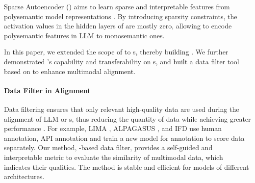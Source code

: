 Sparse Autoencoder (\old{}) aims to learn sparse and interpretable features from polysemantic model representations \cite{yun2021transformer,bricken2023towards,sharkey2022features,peigne2023features, elhage2022toy}. By introducing sparsity constraints, the activation values in the hidden layers of \old{} are mostly zero, allowing \old{} to encode polysemantic features in LLM to monosemantic ones. 

In this paper, we extended the scope of \old{} to \model{}s, thereby building \ours{}. We further demonstrated \ours{}'s capability and transferability on \model{}s, and built a data filter tool based on \ours{} to enhance multimodal alignment.

\paragraph{Data Filter in Alignment}

Data filtering ensures that only relevant high-quality data are used during the alignment of LLM or \model{} s, thus reducing the quantity of data while achieving greater performance \cite{zhou2023lima,chen2023alpagasus,du2023mods,li2023one,li2023quantity,tu2024resofilter}. For example, LIMA \cite{zhou2023lima}, ALPAGASUS \cite{chen2023alpagasus}, and IFD \cite{li2023quantity} use human annotation, API annotation and train a new model for annotation to score data separately. Our method, \ours{}-based data filter, provides a self-guided and interpretable metric to evaluate the similarity of multimodal data, which indicates their qualities. The method is stable and efficient for models of different architectures.




